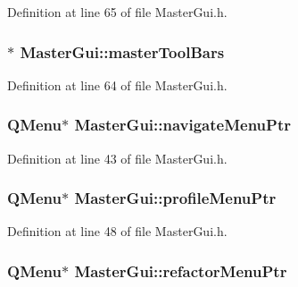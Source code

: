 Definition at line 65 of file Master\-Gui.\-h.

\hypertarget{class_master_gui_afb90e8f19dae43cb78c8495e5708e68b}{
\subsubsection[{master\-Tool\-Bars}]{$\ast$ Master\-Gui\-::master\-Tool\-Bars\hspace{0.3cm}{\ttfamily [private]}}}\label{class_master_gui_afb90e8f19dae43cb78c8495e5708e68b}


Definition at line 64 of file Master\-Gui.\-h.

\hypertarget{class_master_gui_aec75bd894b1c0eecea35c67ecdfcf1b0}{
\subsubsection[{navigate\-Menu\-Ptr}]{\setlength{\rightskip}{0pt plus 5cm}Q\-Menu$\ast$ Master\-Gui\-::navigate\-Menu\-Ptr\hspace{0.3cm}{\ttfamily [private]}}}\label{class_master_gui_aec75bd894b1c0eecea35c67ecdfcf1b0}


Definition at line 43 of file Master\-Gui.\-h.

\hypertarget{class_master_gui_a9c0ef6beee1cb9afcfff786bc4c6bd06}{
\subsubsection[{profile\-Menu\-Ptr}]{\setlength{\rightskip}{0pt plus 5cm}Q\-Menu$\ast$ Master\-Gui\-::profile\-Menu\-Ptr\hspace{0.3cm}{\ttfamily [private]}}}\label{class_master_gui_a9c0ef6beee1cb9afcfff786bc4c6bd06}


Definition at line 48 of file Master\-Gui.\-h.

\hypertarget{class_master_gui_a44e789008fcc276a7a4294beb98d02c7}{
\subsubsection[{refactor\-Menu\-Ptr}]{\setlength{\rightskip}{0pt plus 5cm}Q\-Menu$\ast$ Master\-Gui\-::refactor\-Menu\-Ptr\hspace{0.3cm}{\ttfamily [private]}}}\label{class_master_gui_a44e789008fcc276a7a4294beb98d02c7}


